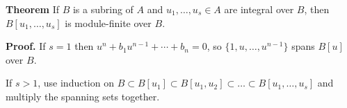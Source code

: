 \documentclass[12pt]{article}
\begin{document}
\textbf{Theorem} If $B$ is a subring of $A$ and $u_1,\ldots,u_s\in A$ are integral over $B$, then $B[u_1,\ldots,u_s]$ is module-finite over $B$.

\textbf{Proof.}
If $s=1$ then $u^n+b_1 u^{n-1}+\cdots+b_n=0$, so $\{1,u,\ldots,u^{n-1}\}$ spans $B[u]$ over $B$.

If $s>1$, use induction on $B\subset B[u_1]\subset B[u_1,u_2]\subset\ldots\subset B[u_1,\ldots,u_s]$ and multiply the spanning sets together.

\end{document}
